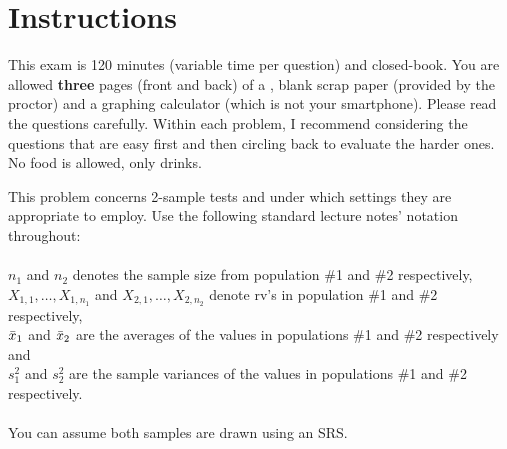 \documentclass[12pt]{article}
\begin{document}
\section*{Instructions}
This exam is 120 minutes (variable time per question) and closed-book. You are allowed \textbf{three} pages (front and back) of a , blank scrap paper (provided by the proctor) and a graphing calculator (which is not your smartphone). Please read the questions carefully. Within each problem, I recommend considering the questions that are easy first and then circling back to evaluate the harder ones. No food is allowed, only drinks. %

\pagebreak


\problem This problem concerns 2-sample tests and under which settings they are appropriate to employ. Use the following standard lecture notes' notation throughout: \\~\\
$n_1$ and $n_2$ denotes the sample size from population \#1 and \#2 respectively,\\
$X_{1,1}, \ldots, X_{1,n_1}$ and $X_{2,1}, \ldots, X_{2,n_2}$ denote rv's in population \#1 and \#2 respectively, \\
$\bar{x}_1$ and $\bar{x}_2$ are the averages of the values in populations \#1 and \#2 respectively and \\
$s^2_1$ and $s^2_2$ are the sample variances of the values in populations \#1 and \#2 respectively.\\~\\
You can assume both samples are drawn using an SRS.
\end{document}
